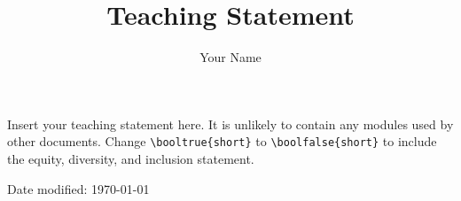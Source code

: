 \documentclass[12pt]{article}
\title{Teaching Statement}
\author{Your Name}
\date{} %
\begin{document}
\maketitle

Insert your teaching statement here. 
It is unlikely to contain any modules used by
other documents. 
Change \verb!\booltrue{short}! to \verb!\boolfalse{short}! to
include the equity, diversity, and inclusion statement.


\vfill
\centering Date modified: \today
\end{document}
